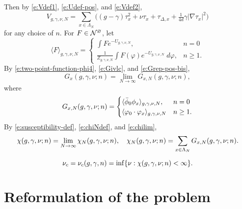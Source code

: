 Then by \eqref{e:Vdef1}, \eqref{e:Udef-pos}, and \eqref{e:Vdef2},
\begin{equation}
V_{g,\gamma,\nu,N}
	=
\sum_{x\in\Lambda_N}
\Big(
	(g - \gamma) \tau_x^2 + \nu \tau_x + \tau_{\Delta,x} + \tfrac{1}{4 d} \gamma |\nabla\tau_x|^2
\Big)
\end{equation}
for any choice of $n$.
For $F \in \mathcal{N}^\varnothing$, let
\begin{equation}
\langle F \rangle_{g,\gamma,\nu,N}
	=
\begin{cases}
\displaystyle \int F e^{-U_{g,\gamma,\nu,N}},           & n = 0 \\
\displaystyle \frac{1}{Z_{g,\gamma,\nu,N}}
	\int F(\varphi) e^{-U_{g,\gamma,\nu,N}} \; d\varphi,  & n \ge 1.
\end{cases}
\end{equation}
By \eqref{e:two-point-function-phi4}, \eqref{e:Givlc}, and \eqref{e:Grep-pos-bis},
\begin{equation}
G_x(g, \gamma, \nu; n) = \lim_{N\to\infty} G_{x,N}(g, \gamma, \nu; n),
\end{equation}
where
\begin{equation}
G_{x,N}(g, \gamma, \nu; n)
	=
\begin{cases}
\langle \bar\phi_0 \phi_x \rangle_{g,\gamma,\nu,N},      & n = 0 \\
\langle \varphi_0 \cdot \varphi_x \rangle_{g,\gamma,\nu,N}  & n \ge 1.
\end{cases}
\end{equation}
By \eqref{e:susceptibility-def}, \eqref{e:chiNdef}, and \eqref{e:chilim},
\begin{equation}
\chi(g, \gamma, \nu; n)
	=
\lim_{N\rightarrow\infty} \chi_N(g, \gamma, \nu; n),
	\quad
\chi_N(g, \gamma, \nu; n)
	=
\sum_{x\in\Lambda_N} G_{x,N}(g, \gamma, \nu; n).
\end{equation}

\begin{equation}
\label{e:nuc-def}
\nu_c = \nu_c(g, \gamma, n) = \inf \{ \nu : \chi(g, \gamma, \nu; n) < \infty \}.
\end{equation}


\section{Reformulation of the problem}


